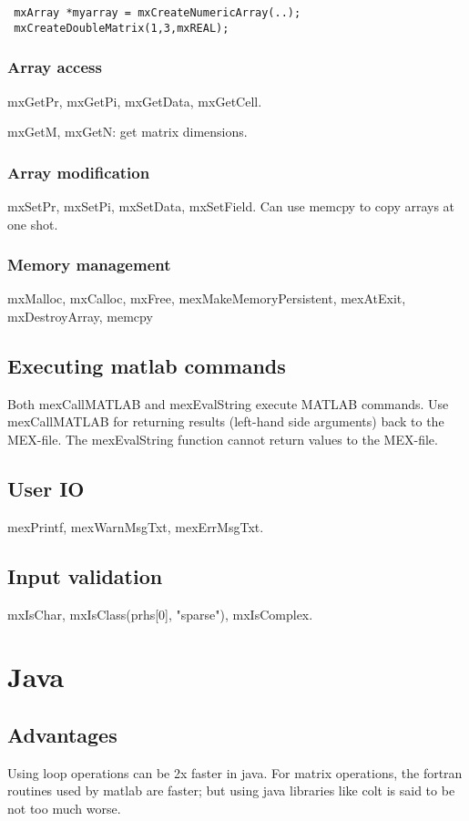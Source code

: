 \documentclass[oneside, article]{memoir}
\begin{document}
\begin{verbatim}
 mxArray *myarray = mxCreateNumericArray(..);
 mxCreateDoubleMatrix(1,3,mxREAL);
\end{verbatim}

\subsubsection{Array access}
mxGetPr, mxGetPi, mxGetData, mxGetCell.

mxGetM, mxGetN: get matrix dimensions. 

\subsubsection{Array modification}
mxSetPr, mxSetPi, mxSetData, mxSetField. Can use memcpy to copy arrays at one shot.

\subsubsection{Memory management}
mxMalloc, mxCalloc, mxFree, mexMakeMemoryPersistent, mexAtExit, mxDestroyArray, memcpy

\subsection{Executing matlab commands}
Both mexCallMATLAB and mexEvalString execute MATLAB commands. Use mexCallMATLAB for returning results (left-hand side arguments) back to the MEX-file. The mexEvalString function cannot return values to the MEX-file.

\subsection{User IO}
mexPrintf, mexWarnMsgTxt, mexErrMsgTxt.

\subsection{Input validation}
mxIsChar, mxIsClass(prhs[0], "sparse"), mxIsComplex.

\section{Java}
\subsection{Advantages}
Using loop operations can be 2x faster in java. For matrix operations, the fortran routines used by matlab are faster; but using java libraries like colt is said to be not too much worse.
\end{document}
